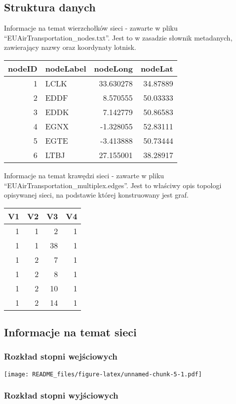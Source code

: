 \documentclass[
]{article}
\begin{document}
\hypertarget{struktura-danych}{%
\subsection{Struktura danych}\label{struktura-danych}}

Informacje na temat wierzchołków sieci - zawarte w pliku
``EUAirTransportation\_nodes.txt''. Jest to w zasadzie słownik
metadanych, zawierający nazwy oraz koordynaty lotnisk.

\begin{longtable}[]{@{}rlrr@{}}
\toprule
nodeID & nodeLabel & nodeLong & nodeLat\tabularnewline
\midrule
\endhead
1 & LCLK & 33.630278 & 34.87889\tabularnewline
2 & EDDF & 8.570555 & 50.03333\tabularnewline
3 & EDDK & 7.142779 & 50.86583\tabularnewline
4 & EGNX & -1.328055 & 52.83111\tabularnewline
5 & EGTE & -3.413888 & 50.73444\tabularnewline
6 & LTBJ & 27.155001 & 38.28917\tabularnewline
\bottomrule
\end{longtable}

Informacje na temat krawędzi sieci - zawarte w pliku
``EUAirTransportation\_multiplex.edges''. Jest to właściwy opis topologi
opisywanej sieci, na podstawie której konstruowany jest graf.

\begin{longtable}[]{@{}rrrr@{}}
\toprule
V1 & V2 & V3 & V4\tabularnewline
\midrule
\endhead
1 & 1 & 2 & 1\tabularnewline
1 & 1 & 38 & 1\tabularnewline
1 & 2 & 7 & 1\tabularnewline
1 & 2 & 8 & 1\tabularnewline
1 & 2 & 10 & 1\tabularnewline
1 & 2 & 14 & 1\tabularnewline
\bottomrule
\end{longtable}

\hypertarget{informacje-na-temat-sieci}{%
\subsection{Informacje na temat sieci}\label{informacje-na-temat-sieci}}

\hypertarget{rozkux142ad-stopni-wejux15bciowych}{%
\subsubsection{Rozkład stopni
wejściowych}\label{rozkux142ad-stopni-wejux15bciowych}}

\texttt{[image: README\_files/figure-latex/unnamed-chunk-5-1.pdf]}

\hypertarget{rozkux142ad-stopni-wyjux15bciowych}{%
\subsubsection{Rozkład stopni
wyjściowych}\label{rozkux142ad-stopni-wyjux15bciowych}}
\end{document}
